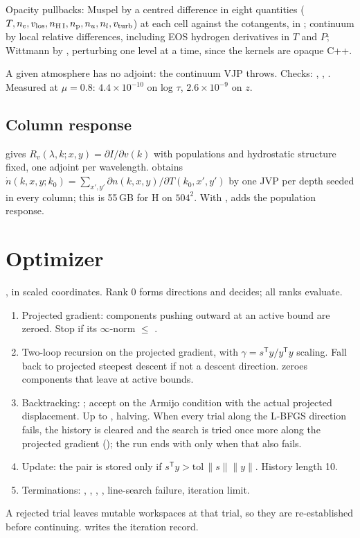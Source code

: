 Opacity pullbacks: Muspel by a centred difference in eight quantities ($T,n_{\rm e},v_{\rm los},n_{\rm H\,I},n_{\rm p},n_u,n_l,v_{\rm turb}$) at each cell against the cotangents, in ; continuum by local relative differences, including EOS hydrogen derivatives in $T$ and $P$; Wittmann by , perturbing one level at a time, since the kernels are opaque C++.

A given atmosphere has no adjoint: the continuum VJP throws. Checks: , , . Measured at $\mu=0.8$: $4.4\times10^{-10}$ on log $\tau$, $2.6\times10^{-9}$ on $z$.

\subsection{Column response}
 gives $R_v(\lambda,k;x,y)=\partial I/\partial v(k)$ with populations and hydrostatic structure fixed, one adjoint per wavelength.  obtains $\dot n(k,x,y;k_0)=\sum_{x',y'}\partial n(k,x,y)/\partial T(k_0,x',y')$ by one JVP per depth seeded in every column; this is 55\,GB for H on $504^2$. With ,  adds the population response.

\section{Optimizer}
, in scaled coordinates. Rank 0 forms directions and decides; all ranks evaluate.
\begin{enumerate}
\item Projected gradient: components pushing outward at an active bound are zeroed. Stop if its $\infty$-norm $\le$ .
\item Two-loop recursion on the projected gradient, with $\gamma=s^{\mathsf T}y/y^{\mathsf T}y$ scaling. Fall back to projected steepest descent if not a descent direction.  zeroes components that leave at active bounds.
\item Backtracking: ; accept on the Armijo condition with the actual projected displacement. Up to , halving. When every trial along the L-BFGS direction fails, the history is cleared and the search is tried once more along the projected gradient (); the run ends with  only when that also fails.
\item Update: the pair is stored only if $s^{\mathsf T}y>\text{tol}\,\|s\|\|y\|$. History length 10.
\item Terminations: , , , , line-search failure, iteration limit.
\end{enumerate}
A rejected trial leaves mutable workspaces at that trial, so they are re-established before continuing.  writes the iteration record.

